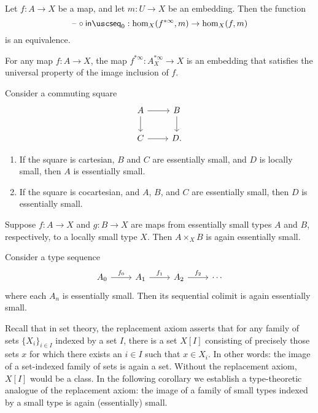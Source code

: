 \begin{lem}\label{lem:finfjp_up}
Let $f:A\to X$ be a map, and let $m:U\to X$ be an embedding. Then the function
\begin{equation*}
\blank\circ \seqin_0: \mathrm{hom}_X(f^{\ast\infty},m)\to \mathrm{hom}_X(f,m)
\end{equation*}
is an equivalence. 
\end{lem}

\begin{thm}\label{lem:isprop_infjp}
For any map $f:A\to X$, the map $f^{\ast\infty}:A_X^{\ast\infty}\to X$ is an embedding that satisfies the universal property of the image inclusion of $f$.
\end{thm}

\begin{lem}
Consider a commuting square
\begin{equation*}
\begin{tikzcd}
A \arrow[r] \arrow[d] & B \arrow[d] \\
C \arrow[r] & D.
\end{tikzcd}
\end{equation*}
\begin{enumerate}
\item If the square is cartesian, $B$ and $C$ are essentially small, and $D$ is locally small, then $A$ is essentially small.
\item If the square is cocartesian, and $A$, $B$, and $C$ are essentially small, then $D$ is essentially small. 
\end{enumerate}
\end{lem}

\begin{cor}
Suppose $f:A\to X$ and $g:B\to X$ are maps from essentially small types $A$ and $B$, respectively, to a locally small type $X$. Then $A\times_X B$ is again essentially small. 
\end{cor}

\begin{lem}
Consider a type sequence
\begin{equation*}
\begin{tikzcd}
A_0 \arrow[r,"f_0"] & A_1 \arrow[r,"f_1"] & A_2 \arrow[r,"f_2"] & \cdots
\end{tikzcd}
\end{equation*}
where each $A_n$ is essentially small. Then its sequential colimit is again essentially small. 
\end{lem}

Recall that in set theory, the replacement axiom asserts that for any family of sets $\{X_i\}_{i\in I}$ indexed by a set $I$, there is a set $X[I]$ consisting of precisely those sets $x$ for which there exists an $i\in I$ such that $x\in X_i$. In other words: the image of a set-indexed family of sets is again a set. Without the replacement axiom, $X[I]$ would be a class. In the following corollary we establish a type-theoretic analogue of the replacement axiom: the image of a family of small types indexed by a small type is again (essentially) small.

